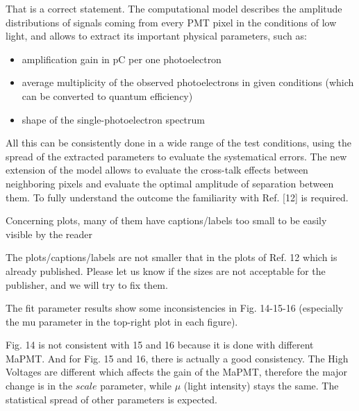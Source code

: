 \documentclass[11pt]{report}
\begin{document}
That is a correct statement.
The computational model describes the amplitude distributions of signals coming from every PMT pixel in the conditions of low light, and allows to extract its important physical parameters, such as:
\begin{itemize}
\item amplification gain in pC per one photoelectron
\item average multiplicity of the observed photoelectrons in given conditions (which can be converted to quantum efficiency)
\item shape of the single-photoelectron spectrum
\end{itemize}
All this can be consistently done in a wide range of the test conditions, using the spread of the extracted parameters to evaluate the systematical errors. The new extension of the model allows to evaluate the cross-talk effects between neighboring pixels and evaluate the optimal amplitude of separation between them.
To fully understand the outcome the familiarity with Ref. [12] is required. 



\begin{tcolorbox}[enlarge top by=2em,colbacktitle=black!60!white,colframe=black!80!white,left=0pt,right=0pt,top=0pt,bottom=0pt,boxrule=0.3pt,title=\bfseries2.06]
Concerning plots, many of them have captions/labels too small to be easily visible by the reader
\end{tcolorbox}

The plots/captions/labels are not smaller that in the plots of Ref. 12 which is already published.
Please let us know if the sizes are not acceptable for the publisher, and we will try to fix them.


\begin{tcolorbox}[enlarge top by=2em,colbacktitle=black!60!white,colframe=black!80!white,left=0pt,right=0pt,top=0pt,bottom=0pt,boxrule=0.3pt,title=\bfseries2.07]
The fit parameter results show some inconsistencies in Fig. 14-15-16 (especially the mu parameter in the top-right plot in each figure).
\end{tcolorbox}


Fig. 14 is not consistent with 15 and 16 because it is done with different MaPMT.
And for Fig. 15 and 16, there is actually a good consistency.
The High Voltages are different which affects the gain of the MaPMT, therefore the major change is in the $scale$ parameter, while $\mu$ (light intensity) stays the same.
The statistical spread of other parameters is expected.
\end{document}
